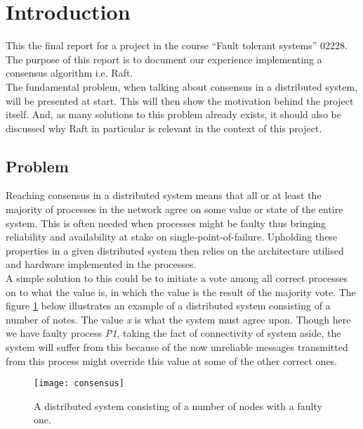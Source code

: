 \setcounter{page}{1}

\section{Introduction} %
\label{sec:introduction}

This the final report for a project in the course ``Fault tolerant systems'' 02228. The purpose of this report is to document our experience implementing a consensus algorithm i.e. Raft. \\

The fundamental problem, when talking about consensus in a distributed system, will be presented at start. This will then show the motivation behind the project itself. And, as many solutions to this problem already exists, it should also be discussed why Raft in particular is relevant in the context of this project.

\subsection{Problem}
Reaching consensus in a distributed system means that all or at least the majority of processes in the network agree on some value or state of the entire system. This is often needed when processes might be faulty thus bringing reliability and availability at stake on single-point-of-failure. Upholding these properties in a given distributed system then relies on the architecture utilised and hardware implemented in the processes.\\ A simple solution to this could be to initiate a vote among all correct processes on to what the value is, in which the value is the result of the majority vote. The figure \ref{consensus} below illustrates an example of a distributed system consisting of a number of notes. The value \textit{x} is what the system must agree upon. Though here we have faulty process \textit{P1}, taking the fact of connectivity of system aside, the system will suffer from this because of the now unreliable messages transmitted from this process might override this value at some of the other correct ones. \\


\begin{figure}[h]
	\centering
	\texttt{[image: consensus]}
	\caption{A distributed system consisting of a number of nodes with a faulty one.}
	\label{consensus}
\end{figure}

